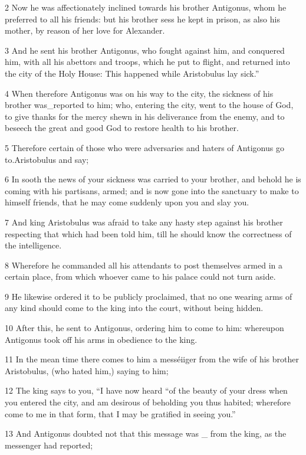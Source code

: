 2 Now he was affectionately inclined towards his brother Antigonus, whom he preferred to all his friends: but his brother sess he kept in prison, as also his mother, by reason of her love for Alexander. 

3 And he sent his brother Antigonus, who fought against him, and conquered him, with all his abettors and troops, which he put to flight, and returned into the city of the Holy House: This happened while Aristobulus lay sick.” 

4 When therefore Antigonus was on his way to the city, the sickness of his brother was_reported to him; who, entering the city, went to the house of God, to give thanks for the mercy shewn in his deliverance from the enemy, and to beseech the great and good God to restore health to his brother. 

5 Therefore certain of those who were adversaries and haters of Antigonus go to.Aristobulus and say; 

6 In sooth the news of your sickness was carried to your brother, and behold he is coming with his partisans, armed; and is now gone into the sanctuary to make to himself friends, that he may come suddenly upon you and slay you. 

7 And king Aristobulus was afraid to take any hasty step against his brother respecting that which had been told him, till he should know the correctness of the intelligence. 

8 Wherefore he commanded all his attendants to post themselves armed in a certain place, from which whoever came to his palace could not turn aside. 

9 He likewise ordered it to be publicly proclaimed, that no one wearing arms of any kind should come to the king into the court, without being hidden. 

10 After this, he sent to Antigonus, ordering him to come to him: whereupon Antigonus took off his arms in obedience to the king. 

11 In the mean time there comes to him a messéiiger from the wife of his brother Aristobulus, (who hated him,) saying to him; 

12 The king says to you, “I have now heard “of the beauty of your dress when you entered the city, and am desirous of beholding you thus habited; wherefore come to me in that form, that I may be gratified in seeing you.” 

13 And Antigonus doubted not that this message was _ from the king, as the messenger had reported; 

